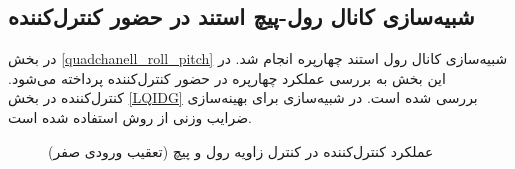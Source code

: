 \subsection{شبیه‌سازی کانال رول-پیچ استند در حضور کنترل‌کننده }
در بخش
\ref{quadchanell_roll_pitch}
شبیه‌سازی کانال رول استند چهارپره انجام شد. در این بخش به بررسی عملکرد چهارپره در حضور کنترل‌کننده  پرداخته می‌شود. کنترل‌کننده   در بخش
\ref{LQIDG}
بررسی شده است.
 در شبیه‌سازی برای بهینه‌سازی ضرایب وزنی   از روش
 \cite{Karimi2010}
استفاده شده است.
%	
\begin{figure}[H]
	\centering
	\caption{‫‪عملکرد کنترل‌کننده  در کنترل زاویه رول و پیچ (تعقیب ورودی صفر)}
	\label{lqidg_roll_pitch_fig_simulation}
\end{figure}



